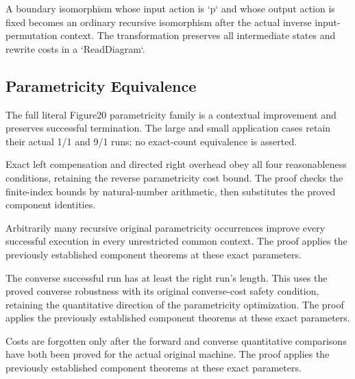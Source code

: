 A boundary isomorphism whose input action is `p` and whose output action
is fixed becomes an ordinary recursive isomorphism after the actual inverse
input-permutation context. The transformation preserves all intermediate
states and rewrite costs in a `ReadDiagram`.
\par{}

\subsection{Parametricity Equivalence}
The full literal Figure20 parametricity family is a contextual improvement
and preserves successful termination. The large and small application cases
retain their actual 1/1 and 9/1 runs; no exact-count equivalence is asserted.

Exact left compensation and directed right overhead obey all four
reasonableness conditions, retaining the reverse parametricity cost bound.
The proof checks the finite-index bounds by natural-number arithmetic, then substitutes the proved component identities.
\par{}

Arbitrarily many recursive original parametricity occurrences improve every
successful execution in every unrestricted common context.
The proof applies the previously established component theorems at these exact parameters.
\par{}

The converse successful run has at least the right run's length. This
uses the proved converse robustness with its original converse-cost safety
condition, retaining the quantitative direction of the parametricity optimization.
The proof applies the previously established component theorems at these exact parameters.
\par{}

Costs are forgotten only after the forward and converse quantitative
comparisons have both been proved for the actual original machine.
The proof applies the previously established component theorems at these exact parameters.
\par{}

